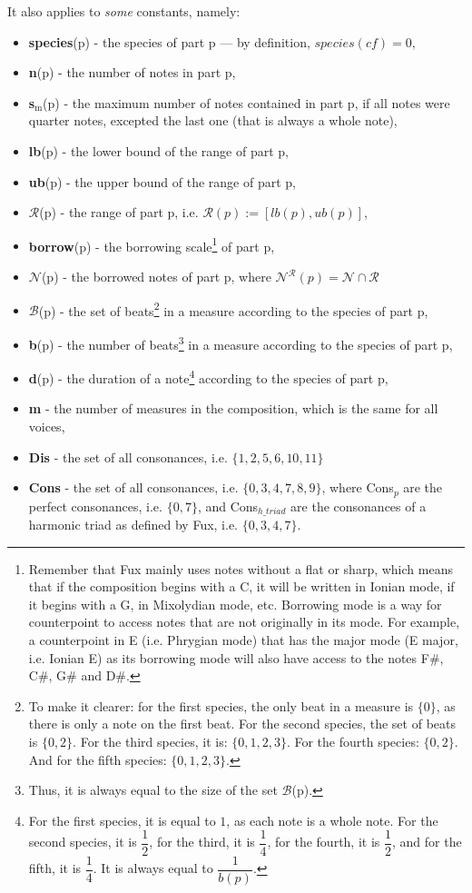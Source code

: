\noindent It also applies to \textit{some} constants, namely:
\begin{itemize}
    \item \textbf{species}(p) - the species of part p --- by definition, $species(\mathit{cf}) = 0$,
    \item \textbf{n}(p) - the number of notes in part p,
    \item \textbf{s$_\text{m}$}(p) - the maximum number of notes contained in part p, if all notes were quarter notes, excepted the last one (that is always a whole note),
    \item \textbf{lb}(p) - the lower bound of the range of part p,
    \item \textbf{ub}(p) - the upper bound of the range of part p,
    \item $\mathcal{R}$(p) - the range of part p, i.e. $\mathcal{R}(p) := [lb(p), ub(p)]$,
    \item \textbf{borrow}(p) - the borrowing scale\footnote{Remember that Fux mainly uses notes without a flat or sharp, which means that if the composition begins with a C, it will be written in Ionian mode, if it begins with a G, in Mixolydian mode, etc. Borrowing mode is a way for counterpoint to access notes that are not originally in its mode. For example, a counterpoint in E (i.e. Phrygian mode) that has the major mode (E major, i.e. Ionian E) as its borrowing mode will also have access to the notes F\#, C\#, G\# and D\#.} of part p,
    \item $\mathcal{N}$(p) - the borrowed notes of part p, where $\mathcal{N}^{\mathcal{R}}(p) = \mathcal{N} \cap \mathcal{R}$
    \item $\mathcal{B}$(p) - the set of beats\footnote{To make it clearer: for the first species, the only beat in a measure is $\{0\}$, as there is only a note on the first beat. For the second species, the set of beats is $\{0, 2\}$. For the third species, it is: $\{0, 1, 2, 3\}$. For the fourth species: $\{0, 2\}$. And for the fifth species: $\{0, 1, 2, 3\}$.} in a measure according to the species of part p,
    \item \textbf{b}(p) - the number of beats\footnote{Thus, it is always equal to the size of the set $\mathcal{B}$(p).} in a measure according to the species of part p,
    \item \textbf{d}(p) - the duration of a note\footnote{For the first species, it is equal to $1$, as each note is a whole note. For the second species, it is $\dfrac{1}{2}$, for the third, it is $\dfrac{1}{4}$, for the fourth, it is $\dfrac{1}{2}$, and for the fifth, it is $\dfrac{1}{4}$. It is always equal to $\dfrac{1}{b(p)}$.} according to the species of part p,
    \item \textbf{m} - the number of measures in the composition, which is the same for all voices,
    \item \textbf{Dis} - the set of all consonances, i.e. $\{1, 2,5, 6, 10, 11\}$
    \item \textbf{Cons} - the set of all consonances, i.e. $\{0, 3, 4, 7, 8, 9\}$, where Cons$_p$ are the perfect consonances, i.e. $\{0, 7\}$, and Cons$_{h\_triad}$ are the consonances of a harmonic triad as defined by Fux, i.e. $\{0, 3, 4, 7\}$.
\end{itemize}
